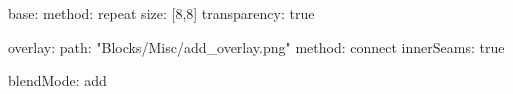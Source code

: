 base:
  method: repeat
  size: [8,8]
  transparency: true

overlay:
  path: "Blocks/Misc/add_overlay.png"
  method: connect
  innerSeams: true

blendMode: add
